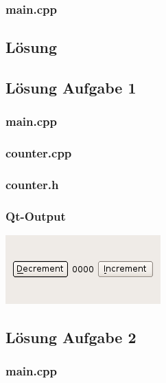 \subsubsection{main.cpp}


\setcounter{section}{12}
\setcounter{subsection}{1}

\subsection{Lösung}
\subsection{Lösung Aufgabe 1}
\subsubsection{main.cpp}

\subsubsection{counter.cpp}

\subsubsection{counter.h}

\subsubsection{Qt-Output}
\begin{center}
	\includegraphics[scale=.5]{./images/u12a1.png}
\end{center}

\subsection{Lösung Aufgabe 2}
\subsubsection{main.cpp}

